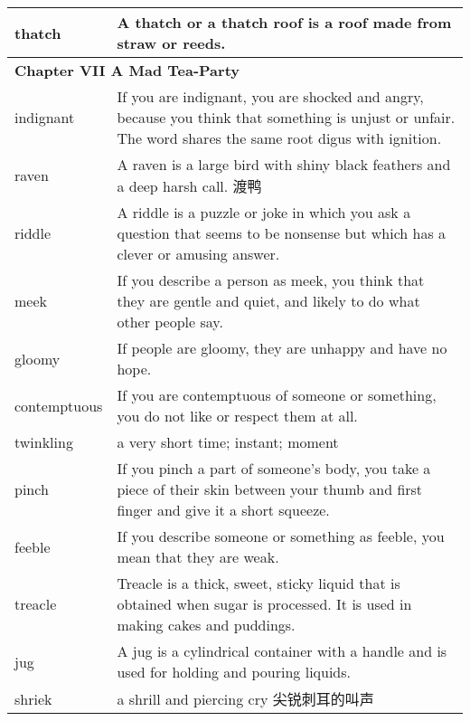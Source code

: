 \documentclass{ctexart}
\begin{document}
\begin{center}
\begin{longtable}{|l|p{7.8cm}|}
\hline
thatch
&
A thatch or a thatch roof is a roof made from straw or reeds.
\\

\hline
\multicolumn{2}{|l|}{\textbf{Chapter VII A Mad Tea-Party}}\\

\hline
indignant
&
If you are indignant, you are shocked and angry, because you think that something is unjust or unfair. The word shares the same root digus with ignition.
\\

\hline
raven
&
A raven is a large bird with shiny black feathers and a deep harsh call. 渡鸭
\\

\hline
riddle
&
A riddle is a puzzle or joke in which you ask a question that seems to be nonsense but which has a clever or amusing answer.
\\

\hline
meek
&
If you describe a person as meek, you think that they are gentle and quiet, and likely to do what other people say.
\\

\hline
gloomy
&
If people are gloomy, they are unhappy and have no hope.
\\

\hline
contemptuous
&
If you are contemptuous of someone or something, you do not like or respect them at all.
\\

\hline
twinkling
&
a very short time; instant; moment
\\

\hline
pinch
&
If you pinch a part of someone's body, you take a piece of their skin between your thumb and first finger and give it a short squeeze.
\\

\hline
feeble
&
If you describe someone or something as feeble, you mean that they are weak.
\\

\hline
treacle
&
Treacle is a thick, sweet, sticky liquid that is obtained when sugar is processed. It is used in making cakes and puddings.
\\

\hline
jug
&
A jug is a cylindrical container with a handle and is used for holding and pouring liquids.
\\

\hline
shriek
&
a shrill and piercing cry 尖锐刺耳的叫声
\\


\end{longtable}
\end{center}
\end{document}
